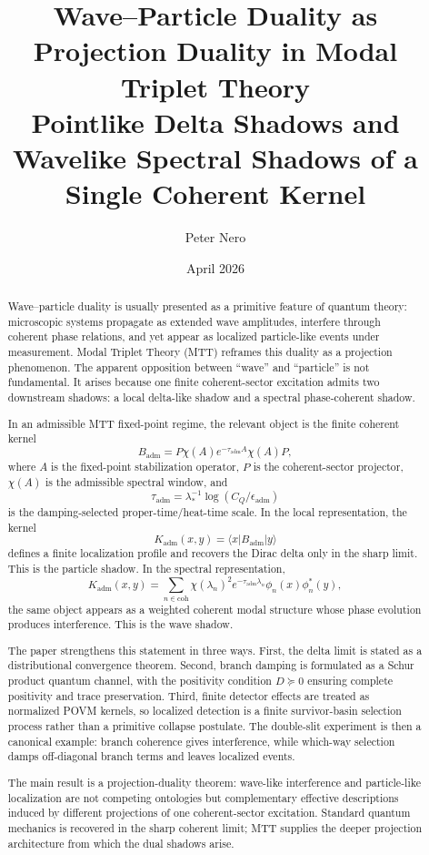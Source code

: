 \documentclass[11pt]{article}
\title{Wave--Particle Duality as Projection Duality in Modal Triplet Theory\\
\large Pointlike Delta Shadows and Wavelike Spectral Shadows of a Single Coherent Kernel}
\author{Peter Nero}
\date{April 2026}
\newcommand{\Kadm}{K_{\mathrm{adm}}}
\newcommand{\Badm}{B_{\mathrm{adm}}}
\newcommand{\ta}{\tau_{\mathrm{adm}}}
\newcommand{\epsadm}{\epsilon_{\mathrm{adm}}}
\newcommand{\coh}{\mathrm{coh}}
\begin{document}
\maketitle
\seriestagline

\begin{abstract}
Wave--particle duality is usually presented as a primitive feature of quantum theory:
microscopic systems propagate as extended wave amplitudes, interfere through coherent
phase relations, and yet appear as localized particle-like events under measurement.
Modal Triplet Theory (MTT) reframes this duality as a projection phenomenon. The
apparent opposition between ``wave'' and ``particle'' is not fundamental. It arises because
one finite coherent-sector excitation admits two downstream shadows: a local delta-like
shadow and a spectral phase-coherent shadow.

In an admissible MTT fixed-point regime, the relevant object is the finite coherent kernel
\[
  \Badm
  =
  P\chi(A)e^{-\ta A}\chi(A)P,
\]
where \(A\) is the fixed-point stabilization operator, \(P\) is the coherent-sector
projector, \(\chi(A)\) is the admissible spectral window, and
\[
  \ta
  =
  \lambda_\ast^{-1}\log(C_Q/\epsadm)
\]
is the damping-selected proper-time/heat-time scale. In the local representation, the kernel
\[
  \Kadm(x,y)=\langle x|\Badm|y\rangle
\]
defines a finite localization profile and recovers the Dirac delta only in the sharp limit.
This is the particle shadow. In the spectral representation,
\[
  \Kadm(x,y)
  =
  \sum_{n\in \coh}
  \chi(\lambda_n)^2 e^{-\ta\lambda_n}
  \phi_n(x)\phi_n^\ast(y),
\]
the same object appears as a weighted coherent modal structure whose phase evolution
produces interference. This is the wave shadow.

The paper strengthens this statement in three ways. First, the delta limit is stated as
a distributional convergence theorem. Second, branch damping is formulated as a Schur
product quantum channel, with the positivity condition \(D\succeq0\) ensuring complete
positivity and trace preservation. Third, finite detector effects are treated as normalized
POVM kernels, so localized detection is a finite survivor-basin selection process rather than
a primitive collapse postulate. The double-slit experiment is then a canonical example:
branch coherence gives interference, while which-way selection damps off-diagonal branch
terms and leaves localized events.

The main result is a projection-duality theorem: wave-like interference and particle-like
localization are not competing ontologies but complementary effective descriptions induced
by different projections of one coherent-sector excitation. Standard quantum mechanics is
recovered in the sharp coherent limit; MTT supplies the deeper projection architecture from
which the dual shadows arise.
\end{abstract}
\end{document}
